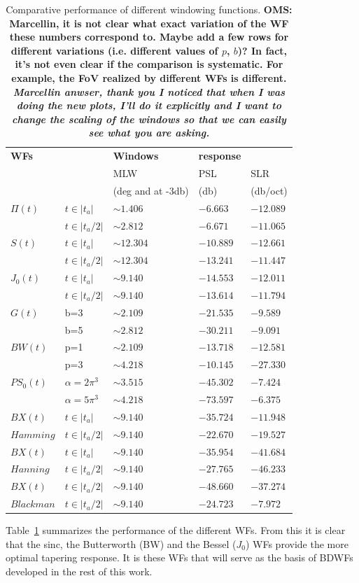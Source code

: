 \documentclass[useAMS,usenatbib]{mn2e}
\begin{document}
\begin{table}
\begin{tabular}{|l||l|l|l|l|}
\hline
 \bf WFs& &\bf{Windows} & \bf response\\
 &&{ MLW} & { PSL}  & { SLR}   \\
  &&\hspace{-0.8cm}(deg and at -3db) & (db) & (db/oct)  \\
\hline\hline
{$\Pi(t)$}  & $t\in|t_a|$& $\sim 1.406$ &$-6.663$ &$-12.089$\\
	    & $t\in|t_a/2|$&$\sim 2.812$ &$-6.671$ &$-11.065$\\
\hline
{$S(t)$} & $t\in|t_a|$ &$\sim 12.304$& $-10.889$&  $-12.661$ \\
	 & $t\in|t_a/2|$ &$\sim 12.304$& $-13.241$&  $-11.447$ \\
\hline
{$J_0(t)$}& $t\in|t_a|$ &$\sim 9.140$ &$ -14.553$ & $ -12.011$\\
	  & $t\in|t_a/2|$ &$\sim 9.140$ &$ -13.614$ & $ -11.794$\\
\hline
{$G(t)$} & b=3 &$\sim 2.109$& $-21.535$& $-9.589$\\ 
	 & b=5 &$\sim 2.812$& $-30.211$& $-9.091$\\ 
\hline
{$BW(t)$} & p=1 &$\sim 2.109$ &$-13.718$ & $-12.581$\\
	  & p=3 &$\sim 4.218$ &$-10.145$ & $-27.330$\\
\hline
{$PS_0(t)$} & $\alpha=2\pi^3$ &$\sim 3.515$& $-45.302$& $-7.424$\\ 
	 & $\alpha=5\pi^3$ &$\sim 4.218$& $-73.597$& $-6.375$\\ 
\hline
{$BX(t)$} & $t\in|t_a|$ &$\sim 9.140$&$-35.724$ & $-11.948$\\ 
{$Hamming$}	 & $t\in|t_a/2|$ &$\sim 9.140$&$-22.670$&$-19.527$\\ 
\hline
{$BX(t)$}   & $t\in|t_a|$ &$\sim 9.140$&$-35.954$ &$-41.684$ \\ 
{$Hanning$}   &$t\in|t_a/2|$ &$\sim 9.140 $&$-27.765$&$-46.233$\\ 
\hline
{$BX(t)$}  & $t\in|t_a/2|$ &$\sim 9.140$&$-48.660$&$-37.274$\\ 
{$Blackman$}	 & $t\in|t_a/2|$ &$\sim 9.140$&$-24.723$&$-7.972$
\end{tabular}
\caption{\label{tab:WF:performance}Comparative performance of 
different windowing functions. 
\bf{OMS: Marcellin, it is not clear what exact variation of the
WF these numbers correspond to. Maybe add a few rows for different variations (i.e. different values
of $p$, $b$)? In fact, it's not even clear if the comparison is systematic. For example, the FoV realized 
by different WFs is different.}
\emph{ Marcellin anwser, thank you I noticed that when I was doing the new plots, I'll do it explicitly and 
I want to change the scaling of the windows so that we can easily see what you are asking.}}
\end{table}
Table~\ref{tab:WF:performance} summarizes the performance of the different WFs. From this it is clear that
the sinc, the Butterworth (BW) and the Bessel ($J_0$) WFs provide the more optimal tapering response. It is these WFs that
will serve as the basis of BDWFs developed in the rest of this work. 
\end{document}
